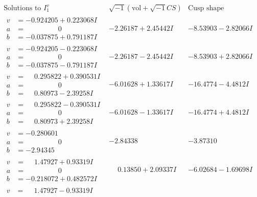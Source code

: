 \documentclass[1p]{elsarticle_modified}
\theoremstyle{definition}
\newcommand{\I}{\sqrt{-1}}
\begin{document}
$$\begin{array}{c|c|c}  
\text{Solutions to }I^v_{1}& \I (\text{vol} + \sqrt{-1}CS) & \text{Cusp shape}\\
 \hline 
\begin{aligned}
v &= -0.924205 + 0.223068 I \\
a &= \phantom{-0.000000 } 0 \\
b &= -0.037875 + 0.791187 I\end{aligned}
 & -2.26187 + 2.45442 I & -8.53903 - 2.82066 I \\ \hline\begin{aligned}
v &= -0.924205 - 0.223068 I \\
a &= \phantom{-0.000000 } 0 \\
b &= -0.037875 - 0.791187 I\end{aligned}
 & -2.26187 - 2.45442 I & -8.53903 + 2.82066 I \\ \hline\begin{aligned}
v &= \phantom{-}0.295822 + 0.390531 I \\
a &= \phantom{-0.000000 } 0 \\
b &= \phantom{-}0.80973 - 2.39258 I\end{aligned}
 & -6.01628 + 1.33617 I & -16.4774 - 4.4812 I \\ \hline\begin{aligned}
v &= \phantom{-}0.295822 - 0.390531 I \\
a &= \phantom{-0.000000 } 0 \\
b &= \phantom{-}0.80973 + 2.39258 I\end{aligned}
 & -6.01628 - 1.33617 I & -16.4774 + 4.4812 I \\ \hline\begin{aligned}
v &= -0.280601\phantom{ +0.000000I} \\
a &= \phantom{-0.000000 } 0 \\
b &= -2.94345\phantom{ +0.000000I}\end{aligned}
 & -2.84338\phantom{ +0.000000I} & -3.87310\phantom{ +0.000000I} \\ \hline\begin{aligned}
v &= \phantom{-}1.47927 + 0.93319 I \\
a &= \phantom{-0.000000 } 0 \\
b &= -0.218072 + 0.482572 I\end{aligned}
 & \phantom{-}0.13850 + 2.09337 I & -6.02684 - 1.69698 I \\ \hline\begin{aligned}
v &= \phantom{-}1.47927 - 0.93319 I \\

\end{aligned}
\end{array}$$
\end{document}

